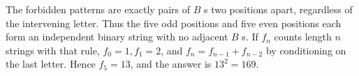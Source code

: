 The forbidden patterns are exactly pairs of $B$ s two positions apart, regardless of the intervening letter. Thus the five odd positions and five even positions each form an independent binary string with no adjacent $B$ s. If $f_n$ counts length $n$ strings with that rule, $f_0=1,f_1=2$, and $f_n=f_{n-1}+f_{n-2}$ by conditioning on the last letter. Hence $f_5=13$, and the answer is $13^2=\boxed{169}$.
